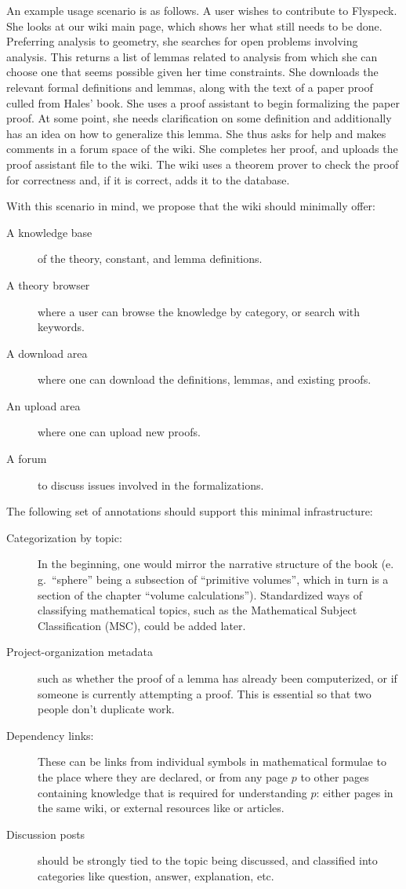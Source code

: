 An example usage scenario is as follows. A user wishes to contribute to
Flyspeck.  She looks at our wiki main page, which shows her what still needs to
be done.  Preferring analysis to geometry, she searches for open problems
involving analysis.  This returns a list of lemmas related to analysis from
which she can choose one that seems possible given her time constraints. She
downloads the relevant formal definitions and lemmas, along with the text of a
paper proof culled from Hales' book.  She uses a proof assistant to begin
formalizing the paper proof.  At some point, she needs
clarification on some definition and additionally has an idea on how to
generalize this lemma.  She thus asks for help and makes comments in a forum
space of the wiki.  She completes her proof, and uploads the proof assistant
file to the wiki.  The wiki uses a theorem prover to check the proof for
correctness and, if it is correct, adds it to the database.

With this scenario in mind, we propose that the wiki should minimally offer: 
\begin{description}
\item[A knowledge base] of the theory, constant, and lemma definitions.
\item[A theory browser] where a user can browse the knowledge by category, or search with keywords.
\item[A download area] where one can download the definitions, lemmas, and existing proofs.
\item[An upload area] where one can upload new proofs.
\item[A forum] to discuss issues involved in the formalizations.
\end{description}

The following set of annotations should support this minimal infrastructure:

\begin{description}
\item[Categorization by topic:] In the beginning, one would mirror the narrative structure
  of the book (e.\,g.\ ``sphere'' being a subsection of ``primitive volumes'', which in turn
  is a section of the chapter ``volume calculations'').  Standardized ways of classifying
  mathematical topics, such as the Mathematical Subject Classification
  (MSC)\cite{AMS:MSC2000}, could be added later.
\item[Project-organization metadata] such as whether the proof
  of a lemma has already been computerized, or if someone is currently 
  attempting a proof.  This is essential so that two people don't duplicate
  work.
\item[Dependency links:] These can be links from individual symbols in
  mathematical formulae to the place where they are declared, or from
  any page $p$ to other pages containing knowledge that is required
  for understanding $p$: either pages in the same wiki, or external
  resources like  or  articles.
\item[Discussion posts] should be strongly tied to the topic being
  discussed, and classified into categories like question, answer,
  explanation, etc.
\end{description}

